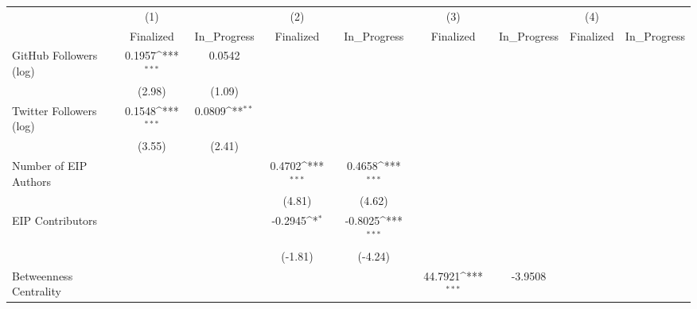 {
\def\sym#1{\ifmmode^{#1}\else\(^{#1}\)\fi}
\begin{tabular}{l*{8}{c}}
\hline\hline
                                   &\multicolumn{1}{c}{(1)}         &                   &\multicolumn{1}{c}{(2)}         &                   &\multicolumn{1}{c}{(3)}         &                   &\multicolumn{1}{c}{(4)}         &                   \\
                                   & Finalized         &In\_Progress         & Finalized         &In\_Progress         & Finalized         &In\_Progress         & Finalized         &In\_Progress         \\
\hline
GitHub Followers (log)             &    0.1957\sym{***}&    0.0542         &                   &                   &                   &                   &                   &                   \\
                                   &    (2.98)         &    (1.09)         &                   &                   &                   &                   &                   &                   \\
[1em]
Twitter Followers (log)            &    0.1548\sym{***}&    0.0809\sym{**} &                   &                   &                   &                   &                   &                   \\
                                   &    (3.55)         &    (2.41)         &                   &                   &                   &                   &                   &                   \\
[1em]
Number of EIP Authors              &                   &                   &    0.4702\sym{***}&    0.4658\sym{***}&                   &                   &                   &                   \\
                                   &                   &                   &    (4.81)         &    (4.62)         &                   &                   &                   &                   \\
[1em]
EIP Contributors                   &                   &                   &   -0.2945\sym{*}  &   -0.8025\sym{***}&                   &                   &                   &                   \\
                                   &                   &                   &   (-1.81)         &   (-4.24)         &                   &                   &                   &                   \\
[1em]
Betweenness Centrality             &                   &                   &                   &                   &   44.7921\sym{***}&   -3.9508         &                   &                   \\

\end{tabular}}
